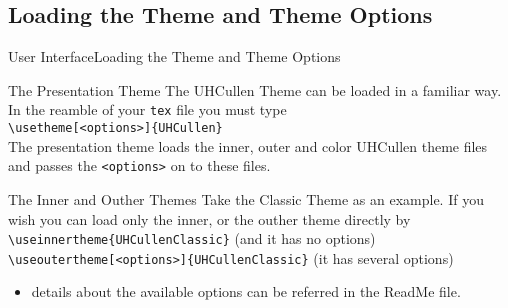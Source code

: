 \documentclass[10pt,xcolor={dvipsnames},aspectratio=169]{beamer}
\begin{document}
\subsection{Loading the Theme and Theme Options}
\begin{frame}{User Interface}{Loading the Theme and Theme Options}
  \vspace{-0.5em}
  \begin{block}{The Presentation Theme}
    \small
    The UHCullen Theme can be loaded in a familiar way. In the reamble of your {\tt tex} file you must type\\
    {\tt \textbackslash usetheme[<options>]\{UHCullen\}}\\
    The presentation theme loads the inner, outer and color UHCullen theme files and passes the {\tt <options>} on to these files.
  \end{block}
  \begin{block}{The Inner and Outher Themes}
    \small
    Take the Classic Theme as an example. If you wish you can load only the inner, or the outher theme directly by\\
    {\tt \textbackslash useinnertheme\{UHCullenClassic\}} (and it has no options)\\
    {\tt \textbackslash useoutertheme[<options>]\{UHCullenClassic\}} (it has several options)\\
    \begin{itemize}
      \item details about the available options can be referred in the ReadMe file.
    \end{itemize}
  \end{block}
\end{frame}
\end{document}

